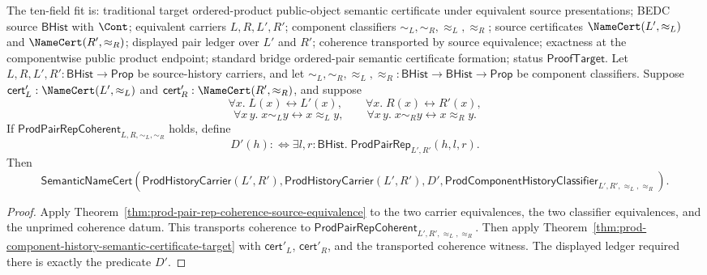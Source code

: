 \begin{theorem}
\label{thm:prod-componentwise-semantic-certificate-source-equivalence}
The ten-field fit is: traditional target ordered-product public-object
semantic certificate under equivalent source presentations; BEDC source
$\mathsf{BHist}$ with $\Cont$; equivalent carriers $L,R,L',R'$; component
classifiers $\sim_L,\sim_R,\approx_L,\approx_R$; source certificates
$\NameCert(L',\approx_L)$ and $\NameCert(R',\approx_R)$; displayed pair ledger
over $L'$ and $R'$; coherence transported by source equivalence; exactness at
the componentwise public product endpoint; standard bridge ordered-pair
semantic certificate formation; status $\mathsf{ProofTarget}$.
Let $L,R,L',R':\mathsf{BHist}\to\mathsf{Prop}$ be source-history carriers, and
let $\sim_L,\sim_R,\approx_L,\approx_R:\mathsf{BHist}\to\mathsf{BHist}\to\mathsf{Prop}$
be component classifiers. Suppose $\mathsf{cert}'_L:\NameCert(L',\approx_L)$
and $\mathsf{cert}'_R:\NameCert(R',\approx_R)$, and suppose
$$
\forall x.\;L(x)\leftrightarrow L'(x),
\qquad
\forall x.\;R(x)\leftrightarrow R'(x),
$$
$$
\forall x\,y.\;x\sim_L y\leftrightarrow x\approx_L y,
\qquad
\forall x\,y.\;x\sim_R y\leftrightarrow x\approx_R y.
$$
If $\mathsf{ProdPairRepCoherent}_{L,R,\sim_L,\sim_R}$ holds, define
$$
D'(h):\Longleftrightarrow
\exists l,r:\mathsf{BHist}.\;\mathsf{ProdPairRep}_{L',R'}(h,l,r).
$$
Then
$$
\mathsf{SemanticNameCert}(\mathsf{ProdHistoryCarrier}(L',R'),
\mathsf{ProdHistoryCarrier}(L',R'),
D',
\mathsf{ProdComponentHistoryClassifier}_{L',R',\approx_L,\approx_R}).
$$
\end{theorem}
\begin{proof}
Apply Theorem~\ref{thm:prod-pair-rep-coherence-source-equivalence} to the two
carrier equivalences, the two classifier equivalences, and the unprimed
coherence datum. This transports coherence to
$\mathsf{ProdPairRepCoherent}_{L',R',\approx_L,\approx_R}$. Then apply
Theorem~\ref{thm:prod-component-history-semantic-certificate-target} with
$\mathsf{cert}'_L$, $\mathsf{cert}'_R$, and the transported coherence witness.
The displayed ledger required there is exactly the predicate $D'$.
\end{proof}

